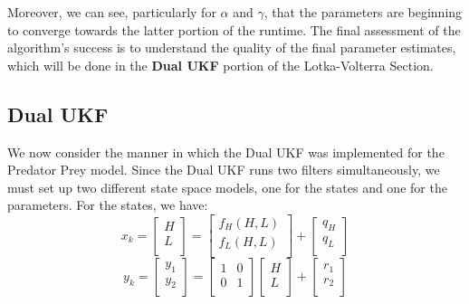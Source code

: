 Moreover, we can see, particularly for $\alpha$ and $\gamma$, that the parameters are beginning to converge towards the latter portion of the runtime. The final assessment of the algorithm's success is to understand the quality of the final parameter estimates, which will be done in the \textbf{Dual UKF} portion of the Lotka-Volterra Section.


\subsection{Dual UKF}
We now consider the manner in which the Dual UKF was implemented for the Predator Prey model. Since the Dual UKF runs two filters simultaneously, we must set up two different state space models, one for the states and one for the parameters. For the states, we have:
$$x_k = \begin{bmatrix}
H\\
L\\
\end{bmatrix} = \begin{bmatrix}
f_H(H,L)\\
f_L(H,L)\\
\end{bmatrix} + \begin{bmatrix}
q_H\\
q_L\\
\end{bmatrix}$$
$$y_k = \begin{bmatrix}
y_1\\
y_2\\
\end{bmatrix} = 
\begin{bmatrix}
1 & 0\\
0 & 1\\
\end{bmatrix}
\begin{bmatrix}
H\\
L\\
\end{bmatrix}+
\begin{bmatrix}
r_1\\
r_2\\
\end{bmatrix}$$


